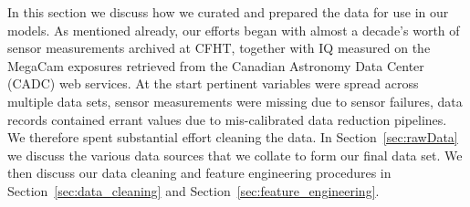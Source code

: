In this section we discuss how we curated and prepared the data for use in our models. As mentioned already, our efforts began with  almost a decade's worth of sensor measurements archived at CFHT, together with IQ measured on the MegaCam exposures retrieved from the Canadian Astronomy Data Center (CADC) web services. 
At the start pertinent variables were spread across multiple data sets, sensor measurements were missing due to sensor failures,  data records contained errant values due to mis-calibrated data reduction pipelines. We therefore spent substantial effort cleaning the data.
In Section~\ref{sec:rawData} we discuss the various data sources that we collate to form our final data set. We then discuss our data cleaning and feature engineering procedures in Section~\ref{sec:data_cleaning} and Section~\ref{sec:feature_engineering}.






